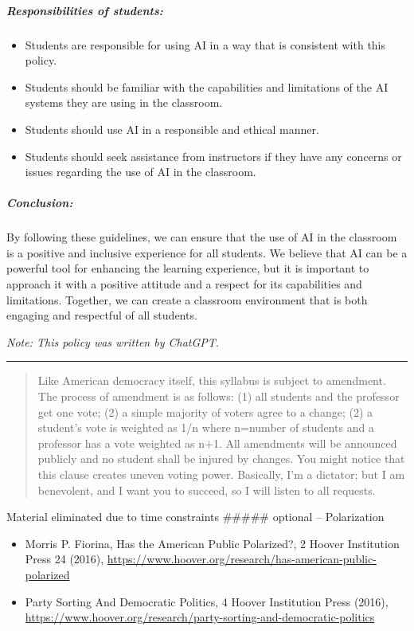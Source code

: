 \documentclass[
]{article}
\providecommand{\tightlist}{%
  \setlength{\itemsep}{0pt}\setlength{\parskip}{0pt}}
\begin{document}
\hypertarget{responsibilities-of-students}{%
\subparagraph{Responsibilities of
students:}\label{responsibilities-of-students}}

\begin{itemize}
\tightlist
\item
  Students are responsible for using AI in a way that is consistent with
  this policy.
\item
  Students should be familiar with the capabilities and limitations of
  the AI systems they are using in the classroom.
\item
  Students should use AI in a responsible and ethical manner.
\item
  Students should seek assistance from instructors if they have any
  concerns or issues regarding the use of AI in the classroom.
\end{itemize}

\hypertarget{conclusion}{%
\subparagraph{Conclusion:}\label{conclusion}}

By following these guidelines, we can ensure that the use of AI in the
classroom is a positive and inclusive experience for all students. We
believe that AI can be a powerful tool for enhancing the learning
experience, but it is important to approach it with a positive attitude
and a respect for its capabilities and limitations. Together, we can
create a classroom environment that is both engaging and respectful of
all students.

\emph{Note: This policy was written by ChatGPT.}

\begin{center}\rule{0.5\linewidth}{0.5pt}\end{center}

\begin{quote}
Like American democracy itself, this syllabus is subject to amendment.
The process of amendment is as follows: (1) all students and the
professor get one vote; (2) a simple majority of voters agree to a
change; (2) a student's vote is weighted as 1/n where n=number of
students and a professor has a vote weighted as n+1. All amendments will
be announced publicly and no student shall be injured by changes. You
might notice that this clause creates uneven voting power. Basically,
I'm a dictator; but I am benevolent, and I want you to succeed, so I
will listen to all requests.
\end{quote}

Material eliminated due to time constraints \#\#\#\#\# optional --
Polarization

\begin{itemize}
\tightlist
\item
  Morris P. Fiorina, Has the American Public Polarized?, 2 Hoover
  Institution Press 24 (2016),
  \url{https://www.hoover.org/research/has-american-public-polarized}
\item
  Party Sorting And Democratic Politics, 4 Hoover Institution Press
  (2016),
  \url{https://www.hoover.org/research/party-sorting-and-democratic-politics}
\end{itemize}

  
\end{document}
